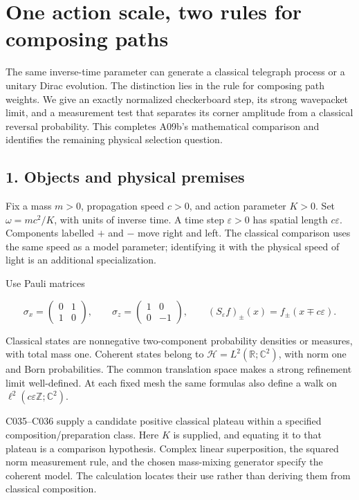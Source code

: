 \documentclass[11pt,a4paper]{article}
\begin{document}
\hypertarget{one-action-scale-two-rules-for-composing-paths}{%
\section{One action scale, two rules for composing
paths}\label{one-action-scale-two-rules-for-composing-paths}}

The same inverse-time parameter can generate a classical telegraph
process or a unitary Dirac evolution. The distinction lies in the rule
for composing path weights. We give an exactly normalized checkerboard
step, its strong wavepacket limit, and a measurement test that separates
its corner amplitude from a classical reversal probability. This
completes A09b's mathematical comparison and identifies the remaining
physical selection question.

\hypertarget{objects-and-physical-premises}{%
\subsection{1. Objects and physical
premises}\label{objects-and-physical-premises}}

Fix a mass \(m>0\), propagation speed \(c>0\), and action parameter
\(K>0\). Set \(\omega=mc^2/K\), with units of inverse time. A time step
\(\varepsilon>0\) has spatial length \(c\varepsilon\). Components
labelled \(+\) and \(-\) move right and left. The classical comparison
uses the same speed as a model parameter; identifying it with the
physical speed of light is an additional specialization.

Use Pauli matrices

\[
\sigma_x=\begin{pmatrix}0&1\\1&0\end{pmatrix},\qquad
\sigma_z=\begin{pmatrix}1&0\\0&-1\end{pmatrix},
\qquad (S_\varepsilon f)_\pm(x)=f_\pm(x\mp c\varepsilon).
\]

Classical states are nonnegative two-component probability densities or
measures, with total mass one. Coherent states belong to
\(\mathcal H=L^2(\mathbb R;\mathbb C^2)\), with norm one and Born
probabilities. The common translation space makes a strong refinement
limit well-defined. At each fixed mesh the same formulas also define a
walk on \(\ell^2(c\varepsilon\mathbb Z;\mathbb C^2)\).

C035--C036 supply a candidate positive classical plateau within a
specified composition/preparation class. Here \(K\) is supplied, and
equating it to that plateau is a comparison hypothesis. Complex linear
superposition, the squared norm measurement rule, and the chosen
mass-mixing generator specify the coherent model. The calculation
locates their use rather than deriving them from classical composition.
\end{document}
